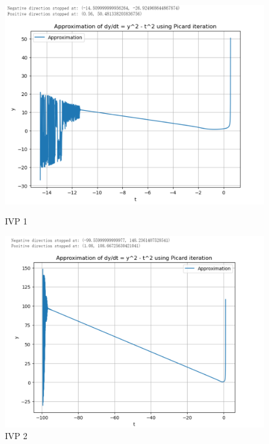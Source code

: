 \documentclass{article}
\begin{document}
\begin{figure}[htbp]
    \centering
    \begin{minipage}[b]{0.45\textwidth}
        \centering
        \includegraphics[width=\textwidth]{pic学长/2 (2).png }
        \caption{IVP 1}
        \label{fig:image1}
    \end{minipage}
    \hspace{0.05\textwidth}
    \begin{minipage}[b]{0.45\textwidth}
        \centering
        \includegraphics[width=\textwidth]{pic学长/3 (2).png}
        \caption{IVP 2}
        \label{fig:image2}
    \end{minipage}
\end{figure}
\end{document}
